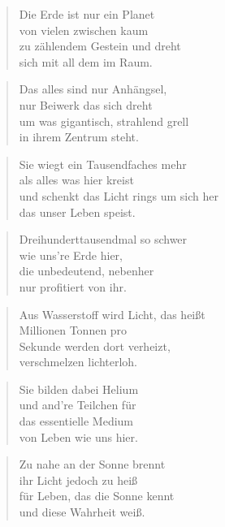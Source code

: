 \documentclass[10pt,a4paper]{article}
\begin{document}
\begin{multicols}{2}
\begin{verse}
Die Erde ist nur ein Planet \\
von vielen zwischen kaum \\
zu zählendem Gestein und dreht \\
sich mit all dem im Raum. \\
\end{verse}

\begin{verse}
Das alles sind nur Anhängsel, \\
nur Beiwerk das sich dreht \\
um was gigantisch, strahlend grell \\
in ihrem Zentrum steht. \\
\end{verse}

\begin{verse}
Sie wiegt ein Tausendfaches mehr \\
als alles was hier kreist \\
und schenkt das Licht rings um sich her \\
das unser Leben speist. \\
\end{verse}

\begin{verse}
Dreihunderttausendmal so schwer \\
wie uns’re Erde hier, \\
die unbedeutend, nebenher \\
nur profitiert von ihr. \\
\end{verse}

\begin{verse}
Aus Wasserstoff wird Licht, das heißt \\
Millionen Tonnen pro \\
Sekunde werden dort verheizt, \\
verschmelzen lichterloh. \\
\end{verse}

\begin{verse}
Sie bilden dabei Helium \\
und and’re Teilchen für \\
das essentielle Medium \\
von Leben wie uns hier. \\
\end{verse}

\begin{verse}
Zu nahe an der Sonne brennt \\
ihr Licht jedoch zu heiß \\
für Leben, das die Sonne kennt \\
und diese Wahrheit weiß. \\
\end{verse}


\end{multicols}
\end{document}
